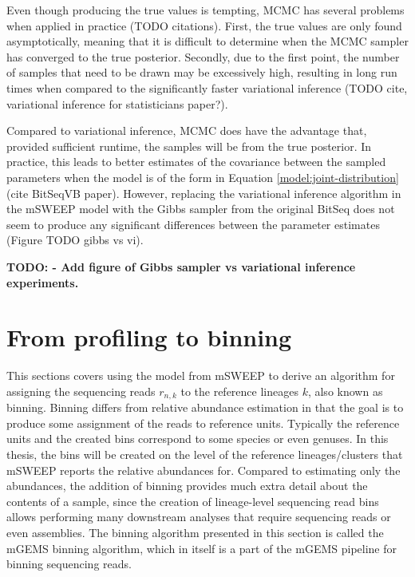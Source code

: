 \documentclass[officiallayout]{tktla}
\begin{document}
Even though producing the true values is tempting, MCMC has several
problems when applied in practice (TODO citations). First, the true
values are only found asymptotically, meaning that it is difficult to
determine when the MCMC sampler has converged to the true
posterior. Secondly, due to the first point, the number of samples
that need to be drawn may be excessively high, resulting in long run
times when compared to the significantly faster variational inference
(TODO cite, variational inference for statisticians paper?).

Compared to variational inference, MCMC does have the advantage that,
provided sufficient runtime, the samples will be from the true
posterior. In practice, this leads to better estimates of the
covariance between the sampled parameters when the model is of the
form in Equation \eqref{model:joint-distribution} (cite BitSeqVB
paper). However, replacing the variational inference algorithm in the
mSWEEP model with the Gibbs sampler from the original BitSeq
\citep{glaus2012identifying} does not seem to produce any significant
differences between the parameter estimates (Figure TODO gibbs vs vi).

\textbf{TODO: - Add figure of Gibbs sampler vs variational inference experiments.}

\section{From profiling to binning}
\label{section:binning}

This sections covers using the model from mSWEEP to derive an
algorithm for assigning the sequencing reads $r_{n, k}$ to the
reference lineages $k$, also known as binning. Binning differs from
relative abundance estimation in that the goal is to produce some
assignment of the reads to reference units. Typically the reference
units and the created bins correspond to some species or even
genuses. In this thesis, the bins will be created on the level of the
reference lineages/clusters that mSWEEP reports the relative
abundances for. Compared to estimating only the abundances, the
addition of binning provides much extra detail about the contents of a
sample, since the creation of lineage-level sequencing read bins
allows performing many downstream analyses that require sequencing
reads or even assemblies. The binning algorithm presented in this
section is called the mGEMS binning algorithm, which in itself is a
part of the mGEMS pipeline for binning sequencing reads.
\end{document}
